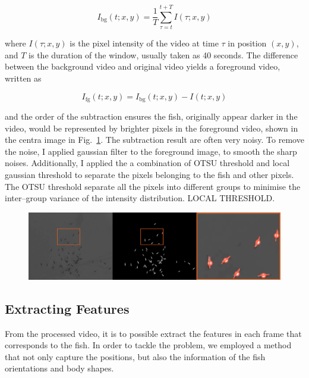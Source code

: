 \documentclass[11pt,twoside]{report}
\begin{document}
\begin{equation}
I_\mathrm{bg}(t; x, y) = \frac{1}{T} \sum_{\tau=t}^{t+T}{I(\tau; x, y)}
\end{equation}

\noindent where $I(\tau; x, y)$ is the pixel intensity of the video at time $\tau$ in position $(x, y)$, and $T$ is the duration of the window, usually taken as 40 seconds. The difference between the background video and original video yields a foreground video, written as

\begin{equation}
	I_\mathrm{fg}(t; x, y) = I_\mathrm{bg}(t; x, y) - I(t; x, y)
\end{equation}

\noindent and the order of the subtraction ensures the fish, originally appear darker in the video, would be represented by brighter pixels in the foreground video, shown in the centra image in Fig.\ \ref{fig:2d_process}. The subtraction result are often very noisy. To remove the noise, I applied gaussian filter to the foreground image, to smooth the sharp noises. Additionally, I applied the a combination of OTSU threshold and local gaussian threshold to separate the pixels belonging to the fish and other pixels. The OTSU threshold separate all the pixels into different groups to minimise the inter--group variance of the intensity distribution. LOCAL THRESHOLD.

\begin{figure}
  \includegraphics[width=\linewidth,outer]{2d-processing.png}
  \caption{}
  \label{fig:2d_process}
\end{figure}


\subsection{Extracting Features}

From the processed video, it is to possible extract the features in each frame that corresponds to the fish. In order to tackle the problem, we employed a method that not only capture the positions, but also the information of the fish orientations and body shapes.
\end{document}
